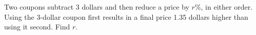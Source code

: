 Two coupons subtract 3 dollars and then reduce a price by $r\%$, in either order. Using the 3-dollar coupon first results in a final price 1.35 dollars higher than using it second. Find $r$.
